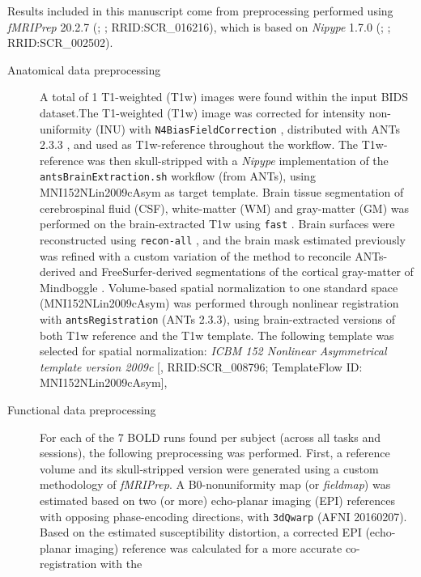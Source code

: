 \documentclass[]{article}
\date{}
\begin{document}
Results included in this manuscript come from preprocessing performed
using \emph{fMRIPrep} 20.2.7 (\citet{fmriprep1}; \citet{fmriprep2};
RRID:SCR\_016216), which is based on \emph{Nipype} 1.7.0
(\citet{nipype1}; \citet{nipype2}; RRID:SCR\_002502).

\begin{description}
\item[Anatomical data preprocessing]
A total of 1 T1-weighted (T1w) images were found within the input BIDS
dataset.The T1-weighted (T1w) image was corrected for intensity
non-uniformity (INU) with \texttt{N4BiasFieldCorrection} \citep{n4},
distributed with ANTs 2.3.3 \citep[RRID:SCR\_004757]{ants}, and used as
T1w-reference throughout the workflow. The T1w-reference was then
skull-stripped with a \emph{Nipype} implementation of the
\texttt{antsBrainExtraction.sh} workflow (from ANTs), using
MNI152NLin2009cAsym as target template. Brain tissue segmentation of
cerebrospinal fluid (CSF), white-matter (WM) and gray-matter (GM) was
performed on the brain-extracted T1w using \texttt{fast} \citep[FSL
5.0.9, RRID:SCR\_002823,][]{fsl_fast}. Brain surfaces were reconstructed
using \texttt{recon-all} \citep[FreeSurfer 6.0.1,
RRID:SCR\_001847,][]{fs_reconall}, and the brain mask estimated
previously was refined with a custom variation of the method to
reconcile ANTs-derived and FreeSurfer-derived segmentations of the
cortical gray-matter of Mindboggle
\citep[RRID:SCR\_002438,][]{mindboggle}. Volume-based spatial
normalization to one standard space (MNI152NLin2009cAsym) was performed
through nonlinear registration with \texttt{antsRegistration} (ANTs
2.3.3), using brain-extracted versions of both T1w reference and the T1w
template. The following template was selected for spatial normalization:
\emph{ICBM 152 Nonlinear Asymmetrical template version 2009c}
{[}\citet{mni152nlin2009casym}, RRID:SCR\_008796; TemplateFlow ID:
MNI152NLin2009cAsym{]},
\item[Functional data preprocessing]
For each of the 7 BOLD runs found per subject (across all tasks and
sessions), the following preprocessing was performed. First, a reference
volume and its skull-stripped version were generated using a custom
methodology of \emph{fMRIPrep}. A B0-nonuniformity map (or
\emph{fieldmap}) was estimated based on two (or more) echo-planar
imaging (EPI) references with opposing phase-encoding directions, with
\texttt{3dQwarp} \citet{afni} (AFNI 20160207). Based on the estimated
susceptibility distortion, a corrected EPI (echo-planar imaging)
reference was calculated for a more accurate co-registration with the

\end{description}
\end{document}
